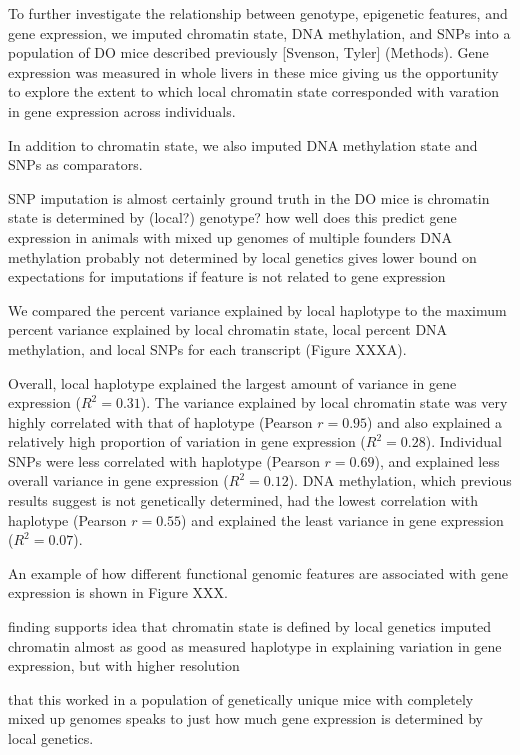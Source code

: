 \documentclass[10pt,letterpaper]{article}
\begin{document}
To further investigate the relationship between genotype, epigenetic
features, and gene expression, we imputed chromatin state, DNA
methylation, and SNPs into a population of DO mice described previously
{[}Svenson, Tyler{]} (Methods). Gene expression was measured in whole
livers in these mice giving us the opportunity to explore the extent to
which local chromatin state corresponded with varation in gene
expression across individuals.

In addition to chromatin state, we also imputed DNA methylation state
and SNPs as comparators.

SNP imputation is almost certainly ground truth in the DO mice is
chromatin state is determined by (local?) genotype? how well does this
predict gene expression in animals with mixed up genomes of multiple
founders DNA methylation probably not determined by local genetics gives
lower bound on expectations for imputations if feature is not related to
gene expression

We compared the percent variance explained by local haplotype to the
maximum percent variance explained by local chromatin state, local
percent DNA methylation, and local SNPs for each transcript (Figure
XXXA).

Overall, local haplotype explained the largest amount of variance in
gene expression (\(R^2 = 0.31\)). The variance explained by local
chromatin state was very highly correlated with that of haplotype
(Pearson \(r = 0.95\)) and also explained a relatively high proportion
of variation in gene expression (\(R^2 = 0.28\)). Individual SNPs were
less correlated with haplotype (Pearson \(r = 0.69\)), and explained
less overall variance in gene expression (\(R^2 = 0.12\)). DNA
methylation, which previous results suggest is not genetically
determined, had the lowest correlation with haplotype (Pearson
\(r = 0.55\)) and explained the least variance in gene expression
(\(R^2 = 0.07\)).

An example of how different functional genomic features are associated
with gene expression is shown in Figure XXX.

finding supports idea that chromatin state is defined by local genetics
imputed chromatin almost as good as measured haplotype in explaining
variation in gene expression, but with higher resolution

that this worked in a population of genetically unique mice with
completely mixed up genomes speaks to just how much gene expression is
determined by local genetics.
\end{document}
